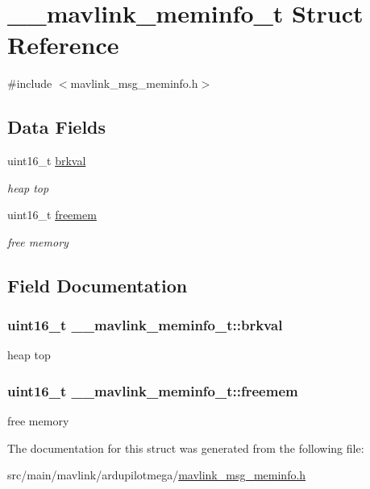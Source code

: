 \hypertarget{struct____mavlink__meminfo__t}{\section{\+\_\+\+\_\+mavlink\+\_\+meminfo\+\_\+t Struct Reference}
\label{struct____mavlink__meminfo__t}
}


{\ttfamily \#include $<$mavlink\+\_\+msg\+\_\+meminfo.\+h$>$}

\subsection*{Data Fields}
\begin{DoxyCompactItemize}
\item 
uint16\+\_\+t \hyperlink{struct____mavlink__meminfo__t_add21ef3cb6f84a2f6a667d2a149f0a5e}{brkval}
\begin{DoxyCompactList}\small\item\em heap top \end{DoxyCompactList}\item 
uint16\+\_\+t \hyperlink{struct____mavlink__meminfo__t_a459eb41bcb076d1150e0d509406d6416}{freemem}
\begin{DoxyCompactList}\small\item\em free memory \end{DoxyCompactList}\end{DoxyCompactItemize}


\subsection{Field Documentation}
\hypertarget{struct____mavlink__meminfo__t_add21ef3cb6f84a2f6a667d2a149f0a5e}{
\subsubsection[{brkval}]{\setlength{\rightskip}{0pt plus 5cm}uint16\+\_\+t \+\_\+\+\_\+mavlink\+\_\+meminfo\+\_\+t\+::brkval}}\label{struct____mavlink__meminfo__t_add21ef3cb6f84a2f6a667d2a149f0a5e}


heap top 

\hypertarget{struct____mavlink__meminfo__t_a459eb41bcb076d1150e0d509406d6416}{
\subsubsection[{freemem}]{\setlength{\rightskip}{0pt plus 5cm}uint16\+\_\+t \+\_\+\+\_\+mavlink\+\_\+meminfo\+\_\+t\+::freemem}}\label{struct____mavlink__meminfo__t_a459eb41bcb076d1150e0d509406d6416}


free memory 



The documentation for this struct was generated from the following file\+:\begin{DoxyCompactItemize}
\item 
src/main/mavlink/ardupilotmega/\hyperlink{mavlink__msg__meminfo_8h}{mavlink\+\_\+msg\+\_\+meminfo.\+h}\end{DoxyCompactItemize}
